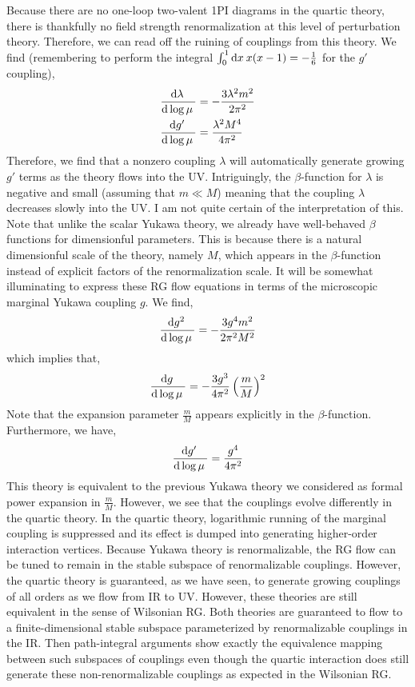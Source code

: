 \documentclass[12pt]{article}
\begin{document}
Because there are no one-loop two-valent 1PI diagrams in the quartic theory, there is thankfully no field strength renormalization at this level of perturbation theory. Therefore, we can read off the ruining of couplings from this theory. We find (remembering to perform the integral $\int_0^1 \mathrm{d}x \: x(x-1) = - \frac{1}{6}$ for the $g'$ coupling),
\begin{align*}
\frac{\mathrm{d}\lambda \:}{\mathrm{d}\log{\mu} \:} & = -\frac{3 \lambda^2 m^2}{2 \pi^2}
\\
\frac{\mathrm{d}g' \:}{\mathrm{d}\log{\mu} \:} & = \frac{\lambda^2 M^4}{4 \pi^2}
\end{align*}
Therefore, we find that a nonzero coupling $\lambda$ will automatically generate growing $g'$ terms as the theory flows into the UV. Intriguingly, the $\beta$-function for $\lambda$ is negative and small (assuming that $m \ll M$) meaning that the coupling $\lambda$ decreases slowly into the UV. I am not quite certain of the interpretation of this. Note that unlike the scalar Yukawa theory, we already have well-behaved $\beta$ functions for dimensionful parameters. This is because there is a natural dimensionful scale of the theory, namely $M$, which appears in the $\beta$-function instead of explicit factors of the renormalization scale. It will be somewhat illuminating to express these RG flow equations in terms of the microscopic marginal Yukawa coupling $g$. We find,
\begin{align*}
\frac{\mathrm{d}g^2 \:}{\mathrm{d}\log{\mu} \:} = - \frac{3 g^4 m^2}{2 \pi^2 M^2}
\end{align*} 
which implies that,
\begin{align*}
\frac{\mathrm{d}g \:}{\mathrm{d}\log{\mu} \:} = - \frac{3 g^3}{4 \pi^2} \left( \frac{m}{M} \right)^2 
\end{align*} 
Note that the expansion parameter $\frac{m}{M}$ appears explicitly in the $\beta$-function. 
Furthermore, we have,
\begin{align*}
\frac{\mathrm{d}g' \:}{\mathrm{d}\log{\mu} \:} = \frac{g^4}{4 \pi^2}
\end{align*}
This theory is equivalent to the previous Yukawa theory we considered as formal power expansion in $\frac{m}{M}$. However, we see that the couplings evolve differently in the quartic theory. In the quartic theory, logarithmic running of the marginal coupling is suppressed and its effect is dumped into generating higher-order interaction vertices. Because Yukawa theory is renormalizable, the RG flow can be tuned to remain in the stable subspace of renormalizable couplings. However, the quartic theory is guaranteed, as we have seen, to generate growing couplings of all orders as we flow from IR to UV. However, these theories are still equivalent in the sense of Wilsonian RG. Both theories are guaranteed to flow to a finite-dimensional stable subspace parameterized by renormalizable couplings in the IR. Then path-integral arguments show exactly the equivalence mapping between such subspaces of couplings even though the quartic interaction does still generate these non-renormalizable couplings as expected in the Wilsonian RG.
\end{document}
